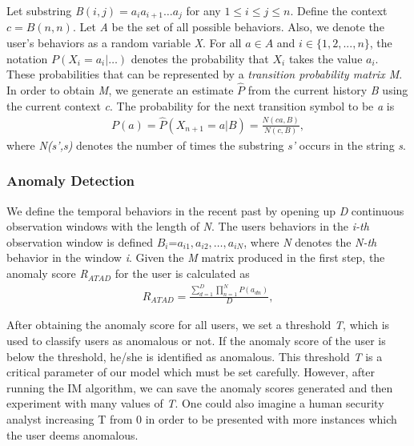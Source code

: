 \documentclass[conference]{IEEEtran}
\begin{document}
Let substring \emph{B$(i, j) = a_ia_{i+1}\ldots a_j$} for any \emph{$1 \leq i \leq j \leq n$}. Define the context \emph{$c = B(n,n)$}. Let \emph{A} be the set of all possible behaviors. Also, we denote the user's behaviors as a random variable \emph{X}. 
For all \emph{$a \in A $} and \emph{$i \in \{1,2,. . ., n\}$}, the notation \emph{$P(X_i = a_i|\ldots)$} denotes the probability that \emph{$X_i$} takes the value \emph{$a_i$}.
These probabilities that can be represented by a \emph{transition
probability matrix M}. 
In order to obtain \emph{M}, we generate an estimate \emph{$\hat P$} from the current history \emph{B} using the current context \emph{c}. The probability for the next transition symbol to be \emph{a} is
\begin{align}
    P(a)=\hat P(X_{n+1}=a|B)= \frac {N(ca,B)}{N(c,B)},
\end{align}
where \emph{N(s',s)} denotes the number of times the substring \emph{s'} occurs in the string \emph{s}.

\subsubsection{Anomaly Detection}


We define the temporal behaviors in the recent past by opening up \emph{D} continuous observation windows with the length of \emph{N}. The users behaviors in the \emph{i-th} observation window is defined  \emph{$B_i$}=\emph{$a_{i1},a_{i2},\dots,a_{iN}$}, where \emph{N} denotes the \emph{N-th} behavior in the window \emph{i}.
Given the \emph{M} matrix produced in the first step, the anomaly score \emph{R$_{ATAD}$} for the user is calculated as
\begin{align}
R_{ATAD}=\frac{\sum_{d=1}^D \prod_{n=1}^N P(a_{dn})}{D},
\end{align}


After obtaining the anomaly score for all users, 
we set a threshold \emph{T}, which is used to classify users as anomalous or not. If the anomaly score of the user is below the threshold, he/she is identified as anomalous. This threshold \emph{T} is a critical parameter of our model which must be set carefully.
However, after running the IM algorithm, we can save the anomaly scores generated and then experiment with many values of \emph{T}. One could also imagine a human security analyst increasing T from 0 in order to be presented with more instances which the user deems anomalous.
\end{document}
